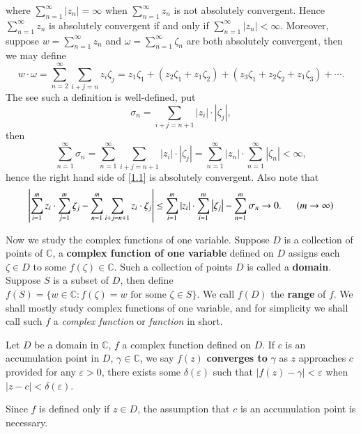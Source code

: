 where $\sum_{n=1}^\infty|z_n|=\infty$ when $\sum_{n=1}^\infty z_n$ is not absolutely convergent. Hence $\sum_{n=1}^\infty z_n$ is absolutely convergent if and only if $\sum_{n=1}^\infty|z_n|<\infty$. Moreover, suppose $w=\sum_{n=1}^\infty z_n$ and $\omega=\sum_{n=1}^\infty\zeta_n$ are both absolutely convergent, then we may define 
\begin{equation}\label{1.1}
w\cdot \omega =\sum_{n=2}^{\infty}{\sum_{i+j=n}{z_i\zeta _j}}=z_1\zeta _1+\left( z_2\zeta _1+z_1\zeta _2 \right) +\left( z_3\zeta _1+z_2\zeta _2+z_1\zeta _3 \right) +\cdots .
\end{equation}
The see such a definition is well-defined, put 
$$
\sigma _n=\sum_{i+j=n+1}{\left| z_i \right|\cdot \left| \zeta _j \right|},
$$
then 
$$
\sum_{n=1}^{\infty}{\sigma _n}=\sum_{n=1}^{\infty}{\sum_{i+j=n+1}{\left| z_i \right|\cdot \left| \zeta _j \right|}}=\sum_{n=1}^{\infty}{\left| z_n \right|}\cdot \sum_{n=1}^{\infty}{\left| \zeta _n \right|}<\infty ,
$$
hence the right hand side of \eqref{1.1} is absolutely convergent. Also note that 
$$
\left| \sum_{i=1}^m{z_i}\cdot \sum_{j=1}^m{\zeta _j}-\sum_{n=1}^m{\sum_{i+j=n+1}{z_i\cdot \zeta _j}} \right|\le \sum_{i=1}^m{\left| z_i \right|}\cdot \sum_{i=1}^m{\left| \zeta _j \right|}-\sum_{n=1}^m{\sigma _n}\rightarrow 0.\hspace{0.5cm}\left( m\rightarrow \infty \right) 
$$\par
Now we study the complex functions of one variable. Suppose $D$ is a collection of points of $\mathbb{C}$, a \textbf{complex function of one variable} defined on $D$ assigns each $\zeta\in D$ to some $f(\zeta)\in\mathbb{C}$. Such a collection of points $D$ is called a \textbf{domain}. Suppose $S$ is a subset of $D$, then define $f(S)=\{w\in\mathbb{C}:f(\zeta)=w\text{ for some }\zeta\in S\}$. We call $f(D)$ the \textbf{range} of $f$. We shall mostly study complex functions of one variable, and for simplicity we shall call such $f$ a \textit{complex function} or \textit{function} in short.
\begin{definition}
Let $D$ be a domain in $\mathbb{C}$, $f$ a complex function defined on $D$. If $c$ is an accumulation point in $D$, $\gamma\in\mathbb{C}$, we say $f(z)$ \textbf{converges to} $\gamma$ as $z$ approaches $c$ provided for any $\varepsilon>0$, there exists some $\delta(\varepsilon)$ such that $|f(z)-\gamma|<\varepsilon$ when $|z-c|<\delta(\varepsilon)$.
\end{definition}
Since $f$ is defined only if $z\in D$, the assumption that $c$ is an accumulation point is necessary.\par
